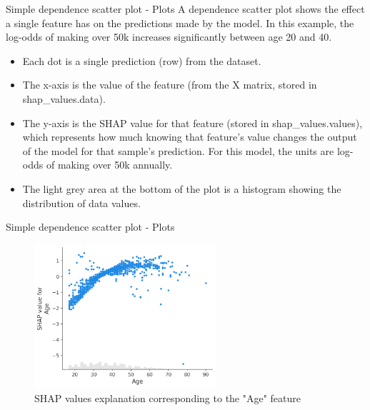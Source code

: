 \documentclass[aspectratio=169]{beamer}
\begin{document}
\begin{frame}{Simple dependence scatter plot - Plots}
A dependence scatter plot shows the effect a single feature has on the predictions made by the model. In this example, the log-odds of making over 50k increases significantly between age 20 and 40.

    \begin{itemize}
        \item Each dot is a single prediction (row) from the dataset.
        \item The x-axis is the value of the feature (from the X matrix, stored in shap\_values.data).
        \item The y-axis is the \ac{SHAP} value for that feature (stored in shap\_values.values), which represents how much knowing that feature’s value changes the output of the model for that sample’s prediction. For this model, the units are log-odds of making over 50k annually.
        \item The light grey area at the bottom of the plot is a histogram showing the distribution of data values.
    \end{itemize}
\end{frame}

\begin{frame}{Simple dependence scatter plot - Plots}
    \begin{figure}[htbp]
        \centering
        \includegraphics[width=0.6\textwidth]{figs/shap/plots/scatter/example_notebooks_api_examples_plots_scatter_3_0.png}
        \caption{\ac{SHAP} values explanation corresponding to the "Age" feature}
        \label{fig:scatter}
    \end{figure}
\end{frame}
\end{document}
